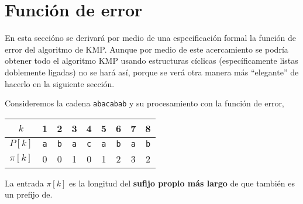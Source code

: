 
\section{Función de error}
En esta seccióno se derivará por medio de una especificación formal la función de error del
algoritmo de KMP. Aunque por medio de este acercamiento\cite{bird:cyclic} se podría obtener todo
el algoritmo KMP usando estructuras cíclicas (específicamente listas doblemente ligadas) no se
hará así, porque se verá otra manera más ``elegante'' de hacerlo en la siguiente sección.

Consideremos la cadena \texttt{abacabab} y su procesamiento con la función de error,

\begin{table}[h]
\centering
\begin{tabular}{c|c|c|c|c|c|c|c|c|}
\cline{2-9}
$k$      & 1          & 2          & 3          & 4          & 5          & 6          & 7          & 8          \\ \hline
$P[k]$   & \texttt{a} & \texttt{b} & \texttt{a} & \texttt{c} & \texttt{a} & \texttt{b} & \texttt{a} & \texttt{b} \\ \hline
$\pi[k]$ & 0          & 0          & 1          & 0          & 1          & 2          & 3          & 2          \\ \cline{2-9} 
\end{tabular}
\end{table}

\begin{center}
La entrada $\pi[k]$ es la longitud del \textbf{sufijo propio más largo} de
 que también es un prefijo de.
\end{center}

